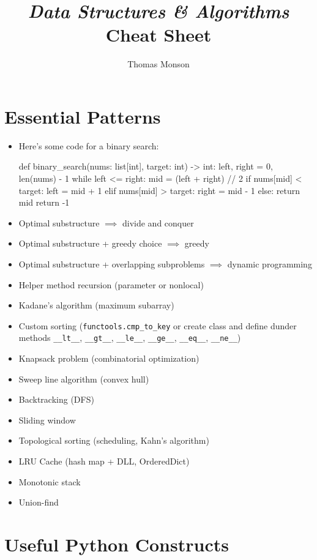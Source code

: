 \documentclass[12pt]{article}
\title{\textit{Data Structures \& Algorithms} Cheat Sheet}
\author{Thomas Monson}
\date{}
\begin{document}
\maketitle

\section{Essential Patterns}

\begin{itemize}
  \item Here's some code for a binary search:
  \begin{python}
def binary_search(nums: list[int], target: int) -> int:
    left, right = 0, len(nums) - 1
    while left <= right:
        mid = (left + right) // 2
        if nums[mid] < target:
            left = mid + 1
        elif nums[mid] > target:
            right = mid - 1
        else:
            return mid
    return -1
  \end{python}
  \item Optimal substructure $\implies$ divide and conquer
  \item Optimal substructure + greedy choice $\implies$ greedy
  \item Optimal substructure + overlapping subproblems $\implies$ dynamic programming
  \item Helper method recursion (parameter or nonlocal)
  \item Kadane's algorithm (maximum subarray)
  \item Custom sorting (\texttt{functools.cmp\_to\_key} or create class and define dunder methods \texttt{\_\_lt\_\_}, \texttt{\_\_gt\_\_}, \texttt{\_\_le\_\_}, \texttt{\_\_ge\_\_}, \texttt{\_\_eq\_\_}, \texttt{\_\_ne\_\_})
  \item Knapsack problem (combinatorial optimization)
  \item Sweep line algorithm (convex hull)
  \item Backtracking (DFS)
  \item Sliding window
  \item Topological sorting (scheduling, Kahn's algorithm)
  \item LRU Cache (hash map + DLL, OrderedDict)
  \item Monotonic stack
  \item Union-find
\end{itemize}

\section{Useful Python Constructs}
\end{document}
